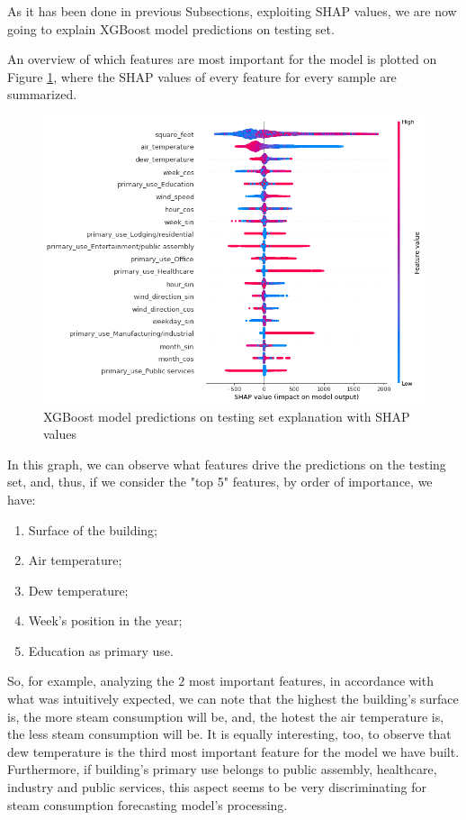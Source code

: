 \documentclass[twocolumn, switch]{article}
\begin{document}
As it has been done in previous Subsections, exploiting SHAP values, we are now going to explain XGBoost model predictions on testing set.

An overview of which features are most important for the model is plotted on Figure \ref{fig:shap_values_summary_plot_steam}, where the SHAP values of every feature for every sample are summarized.

\begin{figure}[H]
\centering
\includegraphics[scale=0.3]{../graphs/shap_values_summary_plot_steam}
\caption{XGBoost model predictions on testing set explanation with SHAP values}
\label{fig:shap_values_summary_plot_steam}
\end{figure}

In this graph, we can observe what features drive the predictions on the testing set, and, thus, if we consider the "top 5" features, by order of importance, we have:

\begin{enumerate}
\item Surface of the building;
\item Air temperature;
\item Dew temperature;
\item Week's position in the year;
\item Education as primary use.
\end{enumerate}

So, for example, analyzing the $2$ most important features, in accordance with what was intuitively expected, we can note that the highest the building's surface is, the more steam consumption will be, and, the hotest the air temperature is, the less steam consumption will be. It is equally interesting, too, to observe that dew temperature is the third most important feature for the model we have built. Furthermore, if building's primary use belongs to public assembly, healthcare, industry and public services, this aspect seems to be very discriminating for steam consumption forecasting model's processing.
\end{document}

